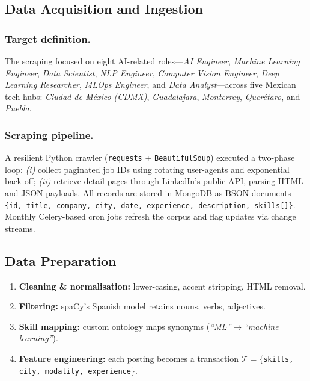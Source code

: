 \documentclass[runningheads]{llncs}
\begin{document}
\subsection{Data Acquisition and Ingestion}
\label{ssec:data_acquisition}

\subsubsection{Target definition.}
The scraping focused on eight AI-related roles—\emph{AI Engineer}, \emph{Machine Learning Engineer}, \emph{Data Scientist}, \emph{NLP Engineer}, \emph{Computer Vision Engineer}, \emph{Deep Learning Researcher}, \emph{MLOps Engineer}, and \emph{Data Analyst}—across five Mexican tech hubs: \emph{Ciudad de México (CDMX)}, \emph{Guadalajara}, \emph{Monterrey}, \emph{Querétaro}, and \emph{Puebla}.


\subsubsection{Scraping pipeline.}
A resilient Python crawler (\texttt{requests} + \texttt{BeautifulSoup}) executed a two-phase loop:  
\emph{(i)} collect paginated job IDs using rotating user-agents and exponential back-off;  
\emph{(ii)} retrieve detail pages through LinkedIn’s public API, parsing HTML and JSON payloads.  
All records are stored in MongoDB as BSON documents
\verb|{id, title, company, city, date, experience, description, skills[]}|.  
Monthly Celery-based cron jobs refresh the corpus and flag updates via change streams.

\subsection{Data Preparation}
\label{ssec:data_prep}

\begin{enumerate}[leftmargin=*]
	\item \textbf{Cleaning \& normalisation:} lower-casing, accent stripping, HTML removal.
	\item \textbf{Filtering:} spaCy’s Spanish model retains nouns, verbs, adjectives.
	\item \textbf{Skill mapping:} custom ontology maps synonyms (\textit{“ML”}$\rightarrow$\textit{“machine learning”}).
	\item \textbf{Feature engineering:} each posting becomes a transaction
	$\mathcal{T}=\{$\texttt{skills, city, modality, experience}$\}$.
\end{enumerate}
\end{document}
